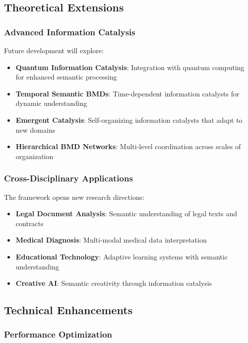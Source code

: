 \documentclass[12pt,a4paper,twoside]{article}
\begin{document}
\begin{itemize}
\subsection{Theoretical Extensions}

\subsubsection{Advanced Information Catalysis}

Future development will explore:

\begin{itemize}
\item \textbf{Quantum Information Catalysis}: Integration with quantum computing for enhanced semantic processing
\item \textbf{Temporal Semantic BMDs}: Time-dependent information catalysts for dynamic understanding
\item \textbf{Emergent Catalysis}: Self-organizing information catalysts that adapt to new domains
\item \textbf{Hierarchical BMD Networks}: Multi-level coordination across scales of organization
\end{itemize}

\subsubsection{Cross-Disciplinary Applications}

The framework opens new research directions:

\begin{itemize}
\item \textbf{Legal Document Analysis}: Semantic understanding of legal texts and contracts
\item \textbf{Medical Diagnosis}: Multi-modal medical data interpretation
\item \textbf{Educational Technology}: Adaptive learning systems with semantic understanding
\item \textbf{Creative AI}: Semantic creativity through information catalysis
\end{itemize}

\subsection{Technical Enhancements}

\subsubsection{Performance Optimization}


\end{itemize}
\end{document}
